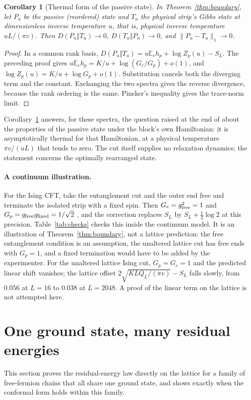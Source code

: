 \documentclass[11pt,a4paper]{article}
\newtheorem{corollary}[theorem]{Corollary}
\theoremstyle{remark}
\newcommand{\E}{\mathbb E}
\begin{document}
\begin{corollary}[Thermal form of the passive state]\label{cor:relative}
In Theorem~\ref{thm:boundary}, let $P_u$ be the passive (reordered) state and $T_u$ the physical strip's Gibbs state at dimensionless inverse temperature $u$, that is, physical inverse temperature $uL/(\pi v)$. Then $D(P_u\Vert T_u)\to0$, $D(T_u\Vert P_u)\to0$, and $\|P_u-T_u\|_1\to0$.
\end{corollary}
\begin{proof}
In a common rank basis, $D(P_u\Vert T_u)=u\E_e h_p+\log Z_p(u)-S_L$. The preceding proof gives $u\E_e h_p=K/u+\log(G_e/G_p)+o(1)$, and $\log Z_p(u)=K/u+\log G_p+o(1)$. Substitution cancels both the diverging term and the constant. Exchanging the two spectra gives the reverse divergence, because the rank ordering is the same. Pinsker's inequality gives the trace-norm limit.
\end{proof}
Corollary~\ref{cor:relative} answers, for these spectra, the question raised at the end of \cite{mula} about the properties of the passive state under the block's own Hamiltonian: it is asymptotically thermal for that Hamiltonian, at a physical temperature $\pi v/(uL)$ that tends to zero. The cut itself supplies no relaxation dynamics; the statement concerns the optimally rearranged state.

\paragraph{A continuum illustration.} For the Ising CFT, take the entanglement cut and the outer end free and terminate the isolated strip with a fixed spin. Then $G_e=g_{\rm free}^2=1$ and $G_p=g_{\rm free}g_{\rm fixed}=1/\sqrt2$ \cite{cardy}, and the correction replaces $S_L$ by $S_L+\tfrac12\log 2$ at this precision. Table~\ref{tab:checks} checks this inside the continuum model. It is an illustration of Theorem~\ref{thm:boundary}, not a lattice prediction: the free entanglement condition is an assumption, the unaltered lattice cut has free ends with $G_p=1$, and a fixed termination would have to be added by the experimenter. For the unaltered lattice Ising cut, $G_p=G_e=1$ and the predicted linear shift vanishes; the lattice offset $2\sqrt{K LQ_L/(\pi v)}-S_L$ falls slowly, from $0.056$ at $L=16$ to $0.038$ at $L=2048$. A proof of the linear term on the lattice is not attempted here.

\section{One ground state, many residual energies}\label{sec:lattice}
This section proves the residual-energy law directly on the lattice for a family of free-fermion chains that all share one ground state, and shows exactly when the conformal form holds within this family.
\end{document}
